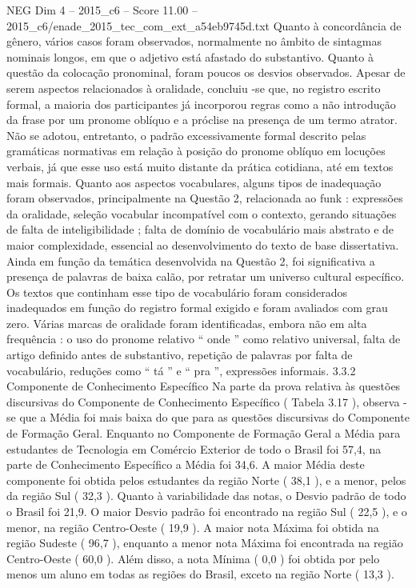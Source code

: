 \begin{textsample}{NEG Dim 4 – 2015\_c6 – Score 11.00 – 2015\_c6/enade\_2015\_tec\_com\_ext\_a54eb9745d.txt}
Quanto à concordância de gênero, vários casos foram observados, normalmente no âmbito de sintagmas nominais longos, em que o adjetivo está afastado do substantivo.
Quanto à questão da colocação pronominal, foram poucos os desvios observados.
Apesar de serem aspectos relacionados à oralidade, concluiu -se que, no registro escrito formal, a maioria dos participantes já incorporou regras como a não introdução da frase por um pronome oblíquo e a próclise na presença de um termo atrator.
Não se adotou, entretanto, o padrão excessivamente formal descrito pelas gramáticas normativas em relação à posição do pronome oblíquo em locuções verbais, já que esse uso está muito distante da prática cotidiana, até em textos mais formais.
Quanto aos aspectos vocabulares, alguns tipos de inadequação foram observados, principalmente na Questão 2, relacionada ao funk : expressões da oralidade, seleção vocabular incompatível com o contexto, gerando situações de falta de inteligibilidade ; falta de domínio de vocabulário mais abstrato e de maior complexidade, essencial ao desenvolvimento do texto de base dissertativa.
Ainda em função da temática desenvolvida na Questão 2, foi significativa a presença de palavras de baixa calão, por retratar um universo cultural específico.
Os textos que continham esse tipo de vocabulário foram considerados inadequados em função do registro formal exigido e foram avaliados com grau zero.
Várias marcas de oralidade foram identificadas, embora não em alta frequência : o uso do pronome relativo “ onde ” como relativo universal, falta de artigo definido antes de substantivo, repetição de palavras por falta de vocabulário, reduções como “ tá ” e “ pra ”, expressões informais. 3.3.2 Componente de Conhecimento Específico Na parte da prova relativa às questões discursivas do Componente de Conhecimento Específico ( Tabela 3.17 ), observa -se que a Média foi mais baixa do que para as questões discursivas do Componente de Formação Geral.
Enquanto no Componente de Formação Geral a Média para estudantes de Tecnologia em Comércio Exterior de todo o Brasil foi 57,4, na parte de Conhecimento Específico a Média foi 34,6.
A maior Média deste componente foi obtida pelos estudantes da região Norte ( 38,1 ), e a menor, pelos da região Sul ( 32,3 ).
Quanto à variabilidade das notas, o Desvio padrão de todo o Brasil foi 21,9.
O maior Desvio padrão foi encontrado na região Sul ( 22,5 ), e o menor, na região Centro-Oeste ( 19,9 ).
A maior nota Máxima foi obtida na região Sudeste ( 96,7 ), enquanto a menor nota Máxima foi encontrada na região Centro-Oeste ( 60,0 ).
Além disso, a nota Mínima ( 0,0 ) foi obtida por pelo menos um aluno em todas as regiões do Brasil, exceto na região Norte ( 13,3 ).

\end{textsample}
